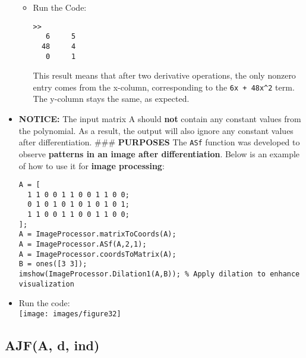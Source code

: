 \documentclass[11pt]{amsart}
\theoremstyle{remark}
\theoremstyle{definition}
\theoremstyle{remark}
\numberwithin{equation}{section}
\begin{document}
\begin{itemize}
  \begin{itemize}
  \item
    Run the Code:

\begin{verbatim}
>> 
   6     5
  48     4
   0     1
\end{verbatim}

    This result means that after two derivative operations, the only
    nonzero entry comes from the x-column, corresponding to the
    \texttt{6x\ +\ 48x^2} term. The y-column stays the same, as expected.
  \end{itemize}
\item
  \textbf{NOTICE:} The input matrix A should \textbf{not} contain any
  constant values from the polynomial. As a result, the output will also
  ignore any constant values after differentiation. \#\#\#
  \textbf{PURPOSES} The \texttt{ASf} function was developed to observe
  \textbf{patterns in an image after differentiation}. Below is an
  example of how to use it for \textbf{image processing}:

\begin{verbatim}
A = [
  1 1 0 0 1 1 0 0 1 1 0 0;
  0 1 0 1 0 1 0 1 0 1 0 1;
  1 1 0 0 1 1 0 0 1 1 0 0;
];
A = ImageProcessor.matrixToCoords(A);
A = ImageProcessor.ASf(A,2,1);
A = ImageProcessor.coordsToMatrix(A);
B = ones([3 3]);
imshow(ImageProcessor.Dilation1(A,B)); % Apply dilation to enhance visualization
\end{verbatim}
\item
  Run the code:\\
  \texttt{[image: images/figure32]}
\end{itemize}

\subsection{AJF(A, d, ind)}\label{ajfa-d-ind}
\end{document}
